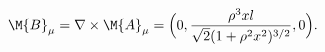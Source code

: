 \begin{equation}
\M{B}_{\mu} = \nabla\times\M{A}_{\mu} =\Bigl (0,\frac{\rho^3x
l}{\sqrt{2}(1+\rho^2x^2)^{3/2}},0\Bigr) .
\label{2.33}
\end{equation} 
